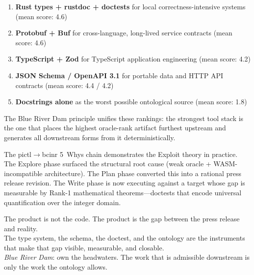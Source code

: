 \documentclass[11pt,a4paper]{article}
\theoremstyle{definition}
\begin{document}
\begin{enumerate}
\item \textbf{Rust types + rustdoc + doctests} for local correctness-intensive systems (mean score: 4.6)
\item \textbf{Protobuf + Buf} for cross-language, long-lived service contracts (mean score: 4.6)
\item \textbf{TypeScript + Zod} for TypeScript application engineering (mean score: 4.2)
\item \textbf{JSON Schema / OpenAPI 3.1} for portable data and HTTP API contracts (mean score: 4.4 / 4.2)
\item \textbf{Docstrings alone} as the worst possible ontological source (mean score: 1.8)
\end{enumerate}

The Blue River Dam principle unifies these rankings: the strongest tool stack is the one that places the highest oracle-rank artifact furthest upstream and generates all downstream forms from it deterministically.

The pictl$\to$bcinr 5~Whys chain demonstrates the Exploit theory in practice. The Explore phase surfaced the structural root cause (weak oracle + WASM-incompatible architecture). The Plan phase converted this into a rational press release revision. The Write phase is now executing against a target whose gap is measurable by Rank-1 mathematical theorems---doctests that encode universal quantification over the integer domain.

\begin{rulebox}
The product is not the code. The product is the gap between the press release and reality.\\[4pt]
The type system, the schema, the doctest, and the ontology are the instruments that make that gap visible, measurable, and closable.\\[4pt]
\textit{Blue River Dam}: own the headwaters. The work that is admissible downstream is only the work the ontology allows.
\end{rulebox}
\end{document}
